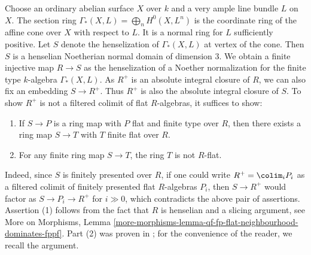 \medskip\noindent
Choose an ordinary abelian surface $X$ over $k$ and a very ample line bundle
$L$ on $X$. The section ring $\Gamma_*(X, L) = \bigoplus_n H^0(X,L^n)$ is
the coordinate ring of the affine cone over $X$ with respect to $L$. It is
a normal ring for $L$ sufficiently positive. Let $S$ denote the henselization
of $\Gamma_*(X, L)$ at vertex of the cone. Then $S$ is a henselian Noetherian
normal domain of dimension $3$. We obtain a finite injective
map $R \to S$ as the henselization of a Noether normalization
for the finite type $k$-algebra $\Gamma_*(X, L)$. As $R^+$ is an
absolute integral closure of $R$, we can also fix an embedding $S \to R^+$.
Thus $R^+$ is also the absolute integral closure of $S$. To show $R^+$
is not a filtered colimit of flat $R$-algebras, it suffices to show:
\begin{enumerate}
\item If $S \to P$ is a ring map with $P$ flat and finite type over $R$,
then there exists a ring map $S \to T$ with $T$ finite flat over $R$.
\item For any finite ring map $S \to T$, the ring $T$ is not $R$-flat.
\end{enumerate}
Indeed, since $S$ is finitely presented over $R$, if one could write
$R^+ = \colim_i P_i$ as a filtered colimit of finitely presented flat
$R$-algebras $P_i$, then $S \to R^+$ would factor as $S \to P_i \to R^+$
for $i \gg 0$, which contradicts the above pair of assertions.
Assertion (1) follows from the fact that $R$ is henselian and a
slicing argument, see More on Morphisms, Lemma
\ref{more-morphisms-lemma-qf-fp-flat-neighbourhood-dominates-fppf}.
Part (2) was proven in \cite{BhattSmallCMMod}; for the convenience of
the reader, we recall the argument.

